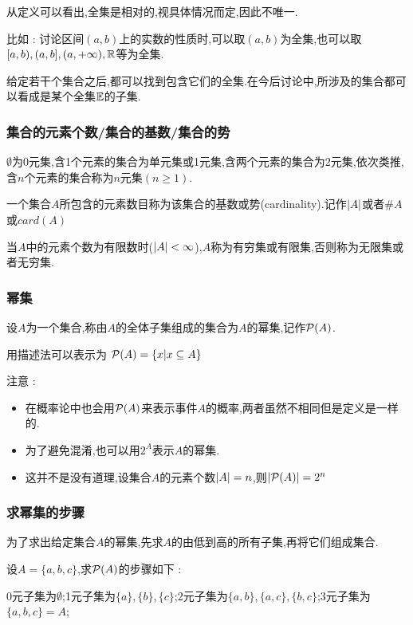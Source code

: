 {{{{  从定义可以看出,全集是相对的,视具体情况而定,因此不唯一.

  比如 : 讨论区间$(a,b)$上的实数的性质时,可以取$(a,b)$为全集,也可以取$[a,b),(a,b],(a , +\infty),\operatorname{\mathbb{R}}$等为全集.

  给定若干个集合之后,都可以找到包含它们的全集.在今后讨论中,所涉及的集合都可以看成是某个全集$\operatorname{\mathbb{E}}$的子集.
}%

\subsubsection{集合的元素个数/集合的基数/集合的势}{
  $\emptyset$为$0$元集,含1个元素的集合为单元集或1元集,含两个元素的集合为2元集,依次类推,含$n$个元素的集合称为$n$元集$(n \geq 1)$.

  一个集合$A$所包含的元素数目称为该集合的基数或势(cardinality).记作$\left\lvert A \right\vert$或者$\#A$或$card(A)$

  当$A$中的元素个数为有限数时($\left\lvert A \right\vert < \infty$),$A$称为有穷集或有限集,否则称为无限集或者无穷集.
}%

\subsubsection{幂集}{
  设$A$为一个集合,称由$A$的全体子集组成的集合为$A$的幂集,记作$\operatorname{\mathcal{P}} (A)$.

  用描述法可以表示为 $\operatorname{\mathcal{P}} (A) = \{x | x \subseteq A\}$

  注意 :

  \begin{itemize}
    \item 在概率论中也会用$\operatorname{\mathcal{P}} (A)$来表示事件$A$的概率,两者虽然不相同但是定义是一样的.
    \item 为了避免混淆,也可以用$2^A$表示$A$的幂集.
    \item 这并不是没有道理,设集合$A$的元素个数$\left\lvert A \right\vert = n$,则$\left\lvert \operatorname{\mathcal{P}} (A) \right\vert = 2^n$
  \end{itemize}
}%

\subsubsection{求幂集的步骤}{
  为了求出给定集合$A$的幂集,先求$A$的由低到高的所有子集,再将它们组成集合.

  设$A = \{a,b,c\}$,求$\operatorname{\mathcal{P}} (A)$的步骤如下 :

  0元子集为$\emptyset$;1元子集为$\{a\},\{b\},\{c\}$;2元子集为$\{a,b\},\{a,c\},\{b,c\}$;3元子集为$\{a,b,c\} = A$;

}}}}

